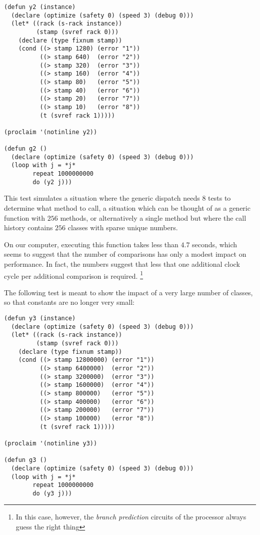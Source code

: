 {\small\begin{verbatim}
(defun y2 (instance)
  (declare (optimize (safety 0) (speed 3) (debug 0)))
  (let* ((rack (s-rack instance))
         (stamp (svref rack 0)))
    (declare (type fixnum stamp))
    (cond ((> stamp 1280) (error "1"))
          ((> stamp 640)  (error "2"))
          ((> stamp 320)  (error "3"))
          ((> stamp 160)  (error "4"))
          ((> stamp 80)   (error "5"))
          ((> stamp 40)   (error "6"))
          ((> stamp 20)   (error "7"))
          ((> stamp 10)   (error "8"))
          (t (svref rack 1)))))

(proclaim '(notinline y2))

(defun g2 ()
  (declare (optimize (safety 0) (speed 3) (debug 0)))
  (loop with j = *j*
        repeat 1000000000
        do (y2 j)))
\end{verbatim}}

This test simulates a situation where the generic dispatch needs $8$
tests to determine what method to call, a situation which can be
thought of as a generic function with $256$ methods, or alternatively
a single method but where the call history contains $256$ classes with
sparse unique numbers.

On our computer, executing this function takes less than $4.7$ seconds,
which seems to suggest that the number of comparisons has only a
modest impact on performance.  In fact, the numbers suggest that
less that one additional clock cycle per additional comparison is
required.%
\footnote{In this case, however, the \emph{branch prediction} circuits
  of the processor always guess the right thing}

The following test is meant to show the impact of a very large number
of classes, so that constants are no longer very small:

{\small\begin{verbatim}
(defun y3 (instance)
  (declare (optimize (safety 0) (speed 3) (debug 0)))
  (let* ((rack (s-rack instance))
         (stamp (svref rack 0)))
    (declare (type fixnum stamp))
    (cond ((> stamp 12800000) (error "1"))
          ((> stamp 6400000)  (error "2"))
          ((> stamp 3200000)  (error "3"))
          ((> stamp 1600000)  (error "4"))
          ((> stamp 800000)   (error "5"))
          ((> stamp 400000)   (error "6"))
          ((> stamp 200000)   (error "7"))
          ((> stamp 100000)   (error "8"))
          (t (svref rack 1)))))

(proclaim '(notinline y3))

(defun g3 ()
  (declare (optimize (safety 0) (speed 3) (debug 0)))
  (loop with j = *j*
        repeat 1000000000
        do (y3 j)))
\end{verbatim}}

